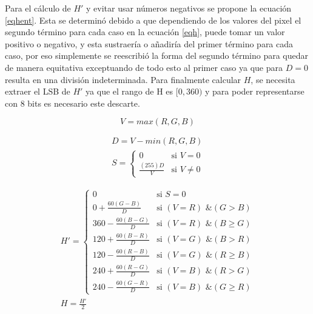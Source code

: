 \documentclass[twoside,spanish,ESP,MSc]{plantillaLabUPV}
\theoremstyle{definition}
\begin{document}
Para el cálculo de $H'$ y evitar usar números negativos se propone la ecuación \ref{eqhent}. Esta se determinó debido a que dependiendo de los valores del pixel el segundo término para cada caso en la ecuación \ref{eqh}, puede tomar un valor positivo o negativo, y esta sustraería o añadiría del primer término para cada caso, por eso simplemente se reescribió la forma del segundo término para quedar de manera equitativa exceptuando de todo esto al primer caso ya que para $D=0$ resulta en una división indeterminada. Para finalmente calcular $H$, se necesita extraer el LSB de $H'$ ya que el rango de H es $[0,360)$ y para poder representarse con 8 bits es necesario este descarte.  

\begin{equation} \label{eqvent}
V = max(R,G,B) 
\end{equation}

\begin{equation} \label{eqsent}
\begin{gathered}
D = V - min(R,G,B) \\
S = \left \{ \begin{matrix}
		0 & \mbox{si } V = 0 \\
		\frac{(255)D}{V} & \mbox{si } V \neq 0  
	\end{matrix}\right.
\end{gathered}
\end{equation}


\begin{equation}\label{eqhent}
\begin{gathered}
{ H' = \left \{ \begin{matrix}
	0 & \mbox {si } S=0 \\ 
	0 + \frac{60(G-B)}{D}			& \mbox{si }(V=R) \mbox{ \& } (G > B) \\
	360 - \frac{60(B-G)}{D}			& \mbox{si }(V=R) \mbox{ \& } (B \geq G) \\
	120 + \frac{60(B-R)}{D}			& \mbox{si }(V=G) \mbox{ \& } (B > R) \\
	120 - \frac{60(R-B)}{D}			& \mbox{si }(V=G) \mbox{ \& } (R \geq B) \\
	240 + \frac{60(R-G)}{D}			& \mbox{si }(V=B) \mbox{ \& } (R > G) \\
	240 - \frac{60(G-R)}{D}			& \mbox{si }(V=B) \mbox{ \& } (G \geq R) 
	\end{matrix}\right. } \\
	H = \frac{H'}{2}
\end{gathered}
\end{equation}
\end{document}
